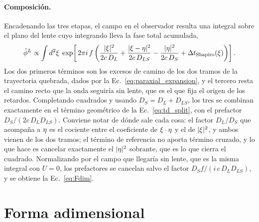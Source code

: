 \documentclass[11pt,a4paper,openany]{book}
\begin{document}
\paragraph{Composici\'on.} Encadenando las tres etapas, el campo en el
observador resulta una integral sobre el plano del lente cuyo integrando lleva
la fase total acumulada,
\begin{equation}
  \tilde\phi^{L}\propto\int d^{2}\vb\xi\;
  \exp\!\left[\,2\pi i\,f\left(
  \frac{|\vb\xi|^{2}}{2c\,D_L}
  +\frac{|\vb\xi-\vb\eta|^{2}}{2c\,D_{LS}}
  -\frac{|\vb\eta|^{2}}{2c\,D_S}
  +\Delta t_{\rm Shapiro}(\vb\xi)\right)\right] .
  \label{eq:composicion}
\end{equation}
Los dos primeros t\'erminos son los excesos de camino de los dos tramos de la
trayectoria quebrada, dados por la Ec.~\eqref{eq:paraxial_expansion}, y el
tercero resta el camino recto que la onda seguir\'ia sin lente, que es el que
fija el origen de los retardos. Completando cuadrados y usando
$D_S=D_L+D_{LS}$, los tres se combinan exactamente en el t\'ermino
geom\'etrico de la Ec.~\eqref{eq:td_split}, con el prefactor
$D_S/(2c\,D_LD_{LS})$. Conviene notar de d\'onde sale cada cosa: el factor
$D_L/D_S$ que acompa\~na a $\vb\eta$ es el cociente entre el coeficiente de
$\vb\xi\cdot\vb\eta$ y el de $|\vb\xi|^{2}$, y ambos vienen de los dos tramos;
el t\'ermino de referencia no aporta t\'ermino cruzado, y lo que hace es cancelar
exactamente el $|\vb\eta|^{2}$ sobrante, que es lo que cierra el cuadrado.
Normalizando por el campo que llegar\'ia sin lente, que es la misma integral
con $U=0$, los prefactores se cancelan salvo el factor
$D_Sf/(i\,c\,D_LD_{LS})$, y se obtiene la Ec.~\eqref{eq:Fdim}.

\section{Forma adimensional}
\label{ap:adimensional}
\end{document}
